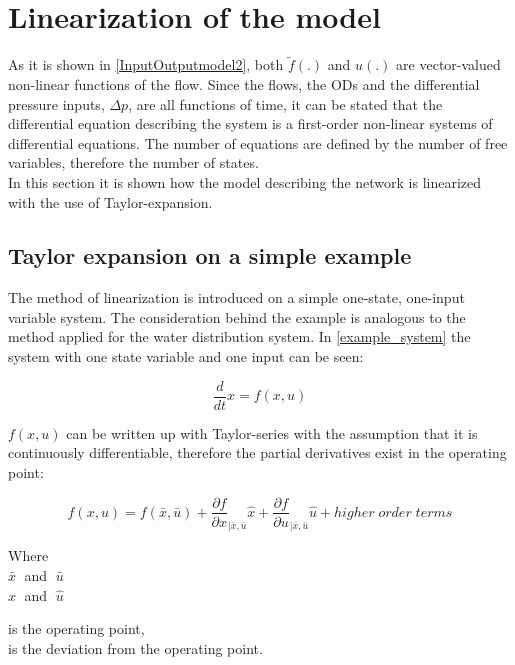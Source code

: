 \section{Linearization of the model} 
\label{Linearization}

As it is shown in \eqref{InputOutputmodel2}, both $\tilde f(.)$ and $u(.)$ are vector-valued non-linear functions of the flow. Since the flows, the ODs and the differential pressure inputs, $\Delta p$, are all functions of time, it can be stated that the differential equation describing the system is a first-order non-linear systems of differential equations. The number of equations are defined by the number of free variables, therefore the number of states.
\\
In this section it is shown how the model describing the network is linearized with the use of Taylor-expansion.

\subsection{Taylor expansion on a simple example}
 \label{Taylorexamplesection}

The method of linearization is introduced on a simple one-state, one-input variable system. The consideration behind the example is analogous to the method applied for the water distribution system. In \eqref{example_system} the system with one state variable and one input can be seen: 

\begin{equation}
\frac{d}{dt} x = f(x,u)
 \label{example_system}
\end{equation}

$f(x,u)$ can be written up with Taylor-series with the assumption that it is continuously differentiable, therefore the partial derivatives exist in the operating point: 

\begin{equation}
f(x,u) = f(\bar{x},\bar{u}) + \frac{\partial f}{\partial x}_{|\bar{x}, \bar{u}} \hat{x} + \frac{\partial f}{\partial u}_{|\bar{x}, \bar{u}} \hat{u} + higher \; order \; terms  
 \label{TaylorExpansion}
\end{equation}

\begin{minipage}[t]{0.20\textwidth}
Where\\
\hspace*{8mm} $\bar{x} \;$ and $\; \bar{u}$ \\
\hspace*{8mm} $\hat{x} \;$ and $\; \hat{u}$ 
\end{minipage}
\begin{minipage}[t]{0.68\textwidth}
\vspace*{2mm}
is the operating point,\\
is the deviation from the operating point.
\end{minipage}


